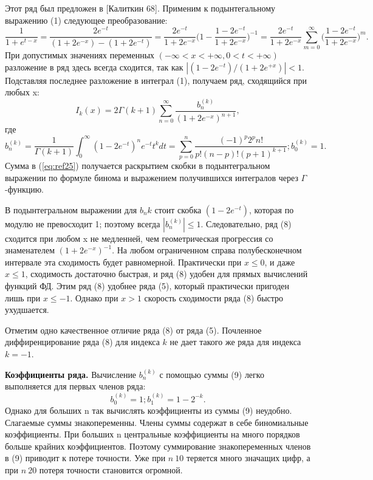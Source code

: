 Этот ряд был предложен в [Калиткин 68]. Применим к подынтегальному выражению
(1) следующее преобразование:
\begin{equation}
\frac{1}{1+e^{t-x}}=\frac{2e^{-t}}{(1+2e^{-x})-(1+2e^{-t})}=\frac{2e^{-t}}{1+2e^{-x}}\Bigg(1-\frac{1-2e^{-t}}{1+2e^{-x}}\Bigg)^{-1}=\frac{2e^{-t}}{1+2e^{-x}} \sum_{m=0}^{\infty} \Bigg(\frac{1-2e^{-t}}{1+2e^{-x}}\Bigg)^{m}.
\end{equation}
При допустимых значениях переменных $(-\infty < x < +\infty,0 < t < +\infty)$ разложение в
ряд здесь всегда сходится, так как $|(1-2e^{-t})/(1+2e^{+x})| < 1$. Подставляя
последнее разложение в интеграл (1), получаем ряд, сходящийся при любых x:
\begin{equation}
I_k(x)=2\Gamma(k+1)\sum_{n=0}^{\infty} \frac{b_n^{(k)}}{(1+2e^{-x})^{n+1}},
\label{eq:ref24}
\end{equation}
где
\begin{equation}
b_n^{(k)}=\frac{1}{\Gamma(k+1)}\int_0^{\infty} (1-2e^{-t})^ne^{-t}t^kdt=\sum_{p=0}^n \frac{(-1)^p2^pn!}{p!(n-p)!(p+1)^{k+1}};b_0^(k)=1.
\label{eq:ref25}
\end{equation}
Сумма в (\ref{eq:ref25}) получается раскрытием скобки в подынтегральном выражении по
формуле бинома и выражением получившихся интегралов через $\Gamma$ -функцию.

В подынтегральном выражении для $b_nk$ стоит скобка $(1-2e^{-t})$, которая по
модулю не превосходит 1; поэтому всегда $|b_n^{(k)}| \leqslant 1$.
Следовательно, ряд (8) сходится при любом x не медленней, чем геометрическая прогрессия со
знаменателем $(1+2e^{-x})^{-1}$. На любом ограниченном справа полубесконечном
интервале эта сходимость будет равномерной. Практически при $x \leqslant 0$, и даже
$x \leqslant 1$, сходимость достаточно быстрая, и ряд (8) удобен для прямых вычислений
функций ФД. Этим ряд (8) удобнее ряда (5), который практически пригоден
лишь при $x \leqslant -1$. Однако при $x > 1$ скорость сходимости ряда (8) быстро
ухудшается.

Отметим одно качественное отличие ряда (8) от ряда (5). Почленное
диффиренцирование ряда (8) для индекса $k$ не дает такого же ряда для индекса
$k=-1$.

\textbf{Коэффициенты ряда.} Вычисление $b_n^{(k)}$ с помощью суммы (9) легко
выполняется для первых членов ряда:
\begin{equation}
b_0^{(k)}=1;b_1^{(k)}=1-2^{-k}.
\end{equation}
Однако для больших n так вычислять коэффициенты из суммы (9) неудобно.
Слагаемые суммы знакопеременны. Члены суммы содержат в себе
биномиальные коэффициенты. При больших n центральные коэффициенты на
много порядков больше крайних коэффициентов. Поэтому суммирование
знакопеременных членов в (9) приводит к потере точности. Уже при $n~10$
теряется много значащих цифр, а при $n~20$ потеря точности становится
огромной.


